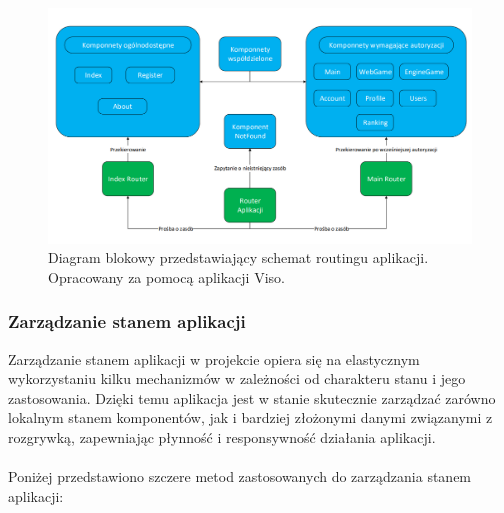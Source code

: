 \documentclass[12pt,a4paper]{article}
\begin{document}
\vspace{1cm}
\begin{figure}[h!]
    \centering
    \includegraphics[width=1\textwidth]{images/diagram_routing.png}
    \caption{Diagram blokowy przedstawiający schemat routingu aplikacji. Opracowany za pomocą aplikacji Viso.}
\end{figure}

\newpage

\subsubsection{Zarządzanie stanem aplikacji}
Zarządzanie stanem aplikacji w projekcie opiera się na elastycznym wykorzystaniu kilku mechanizmów w zależności od charakteru stanu i jego zastosowania. Dzięki temu aplikacja jest w stanie skutecznie zarządzać zarówno lokalnym stanem komponentów, jak i bardziej złożonymi danymi związanymi z rozgrywką, zapewniając płynność i responsywność działania aplikacji.
\\\\
Poniżej przedstawiono szczere metod zastosowanych do zarządzania stanem aplikacji:
\end{document}

